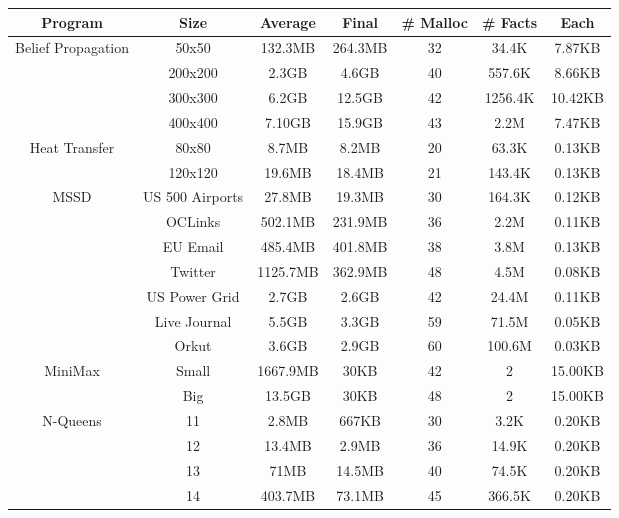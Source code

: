 \begin{tabular}{c | c || c | c | c || c c} \hline
	\textbf{Program} & \textbf{Size} & \textbf{Average} & \textbf{Final} & \textbf{\# Malloc} & \textbf{\# Facts} & \textbf{Each} \\ \hline \hline
	\multirow{4}{*}{Belief Propagation}  & 50x50 & 132.3MB & 264.3MB & 32 & 34.4K & 7.87KB \\
		 & 200x200 & 2.3GB & 4.6GB & 40 & 557.6K & 8.66KB \\
		 & 300x300 & 6.2GB & 12.5GB & 42 & 1256.4K & 10.42KB \\
		 & 400x400 & 7.10GB & 15.9GB & 43 & 2.2M & 7.47KB \\
	\hline
	\multirow{2}{*}{Heat Transfer}  & 80x80 & 8.7MB & 8.2MB & 20 & 63.3K & 0.13KB \\
		 & 120x120 & 19.6MB & 18.4MB & 21 & 143.4K & 0.13KB \\
	\hline
	\multirow{7}{*}{MSSD}  & US 500 Airports & 27.8MB & 19.3MB & 30 & 164.3K & 0.12KB \\
		 & OCLinks & 502.1MB & 231.9MB & 36 & 2.2M & 0.11KB \\
		 & EU Email & 485.4MB & 401.8MB & 38 & 3.8M & 0.13KB \\
		 & Twitter & 1125.7MB & 362.9MB & 48 & 4.5M & 0.08KB \\
		 & US Power Grid & 2.7GB & 2.6GB & 42 & 24.4M & 0.11KB \\
		 & Live Journal & 5.5GB & 3.3GB & 59 & 71.5M & 0.05KB \\
		 & Orkut & 3.6GB & 2.9GB & 60 & 100.6M & 0.03KB \\
	\hline
	\multirow{2}{*}{MiniMax}  & Small & 1667.9MB & 30KB & 42 & 2 & 15.00KB \\
		 & Big & 13.5GB & 30KB & 48 & 2 & 15.00KB \\
	\hline
	\multirow{4}{*}{N-Queens}  & 11 & 2.8MB & 667KB & 30 & 3.2K & 0.20KB \\
		 & 12 & 13.4MB & 2.9MB & 36 & 14.9K & 0.20KB \\
		 & 13 & 71MB & 14.5MB & 40 & 74.5K & 0.20KB \\
		 & 14 & 403.7MB & 73.1MB & 45 & 366.5K & 0.20KB \\
	\hline
\end{tabular}
